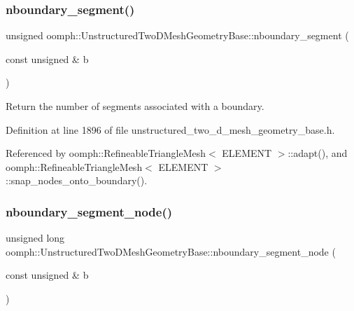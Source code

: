 \subsubsection{\texorpdfstring{nboundary\+\_\+segment()}{nboundary\_segment()}}
{\footnotesize\ttfamily unsigned oomph\+::\+Unstructured\+Two\+D\+Mesh\+Geometry\+Base\+::nboundary\+\_\+segment (\begin{DoxyParamCaption}\item[{const unsigned \&}]{b }\end{DoxyParamCaption})\hspace{0.3cm}{\ttfamily [inline]}}



Return the number of segments associated with a boundary. 



Definition at line 1896 of file unstructured\+\_\+two\+\_\+d\+\_\+mesh\+\_\+geometry\+\_\+base.\+h.



Referenced by oomph\+::\+Refineable\+Triangle\+Mesh$<$ E\+L\+E\+M\+E\+N\+T $>$\+::adapt(), and oomph\+::\+Refineable\+Triangle\+Mesh$<$ E\+L\+E\+M\+E\+N\+T $>$\+::snap\+\_\+nodes\+\_\+onto\+\_\+boundary().

\mbox{\label{classoomph_1_1UnstructuredTwoDMeshGeometryBase_a667c4dff46145685622836fc3b7af92d}} 
\subsubsection{\texorpdfstring{nboundary\+\_\+segment\+\_\+node()}{nboundary\_segment\_node()}\hspace{0.1cm}{\footnotesize\ttfamily [1/2]}}
{\footnotesize\ttfamily unsigned long oomph\+::\+Unstructured\+Two\+D\+Mesh\+Geometry\+Base\+::nboundary\+\_\+segment\+\_\+node (\begin{DoxyParamCaption}\item[{const unsigned \&}]{b }\end{DoxyParamCaption})\hspace{0.3cm}{\ttfamily [inline]}}



